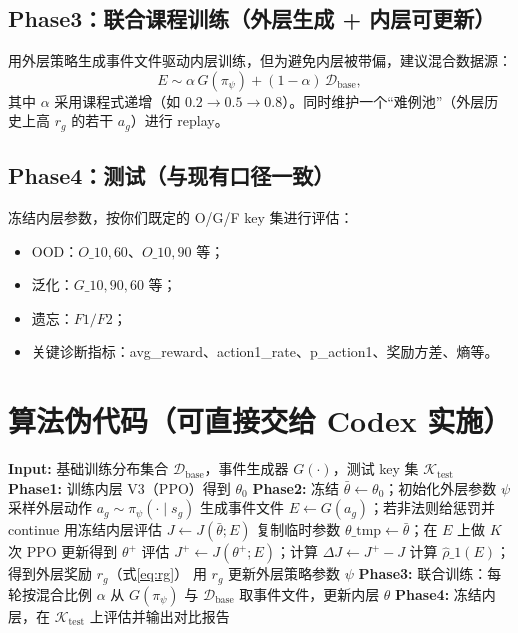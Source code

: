 \documentclass[UTF8,11pt,a4paper]{ctexart}
\begin{document}
\subsection{Phase3：联合课程训练（外层生成 + 内层可更新）}
用外层策略生成事件文件驱动内层训练，但为避免内层被带偏，建议混合数据源：
\begin{equation}
 E \sim \alpha\,G(\pi_\psi) + (1-\alpha)\,\mathcal{D}_{\mathrm{base}},
\end{equation}
其中 $\alpha$ 采用课程式递增（如 $0.2\to 0.5\to 0.8$）。同时维护一个``难例池''（外层历史上高 $r_g$ 的若干 $a_g$）进行 replay。

\subsection{Phase4：测试（与现有口径一致）}
冻结内层参数，按你们既定的 O/G/F key 集进行评估：
\begin{itemize}
\item OOD：$O\_{10,60}$、$O\_{10,90}$ 等；
\item 泛化：$G\_{10,90,60}$ 等；
\item 遗忘：$F1/F2$；
\item 关键诊断指标：avg\_reward、action1\_rate、p\_action1、奖励方差、熵等。
\end{itemize}

\section{算法伪代码（可直接交给 Codex 实施）}

\begin{algorithm}[H]
\caption{V3+EDRL（概念版伪代码）}
\begin{algorithmic}[1]
\State \textbf{Input:} 基础训练分布集合 $\mathcal{D}_{\mathrm{base}}$，事件生成器 $G(\cdot)$，测试 key 集 $\mathcal{K}_{\mathrm{test}}$
\State \textbf{Phase1:} 训练内层 V3（PPO）得到 $\theta_0$
\State \textbf{Phase2:} 冻结 $\bar\theta\leftarrow\theta_0$；初始化外层参数 $\psi$
  \State 采样外层动作 $a_g\sim\pi_\psi(\cdot\mid s_g)$
  \State 生成事件文件 $E\leftarrow G(a_g)$；若非法则给惩罚并 continue
  \State 用冻结内层评估 $J\leftarrow J(\bar\theta;E)$
  \State 复制临时参数 $\theta\_\mathrm{tmp}\leftarrow\bar\theta$；在 $E$ 上做 $K$ 次 PPO 更新得到 $\theta^+$
  \State 评估 $J^+\leftarrow J(\theta^+;E)$；计算 $\Delta J\leftarrow J^+-J$
  \State 计算 $\hat\rho\_1(E)$；得到外层奖励 $r_g$（式\eqref{eq:rg}）
  \State 用 $r_g$ 更新外层策略参数 $\psi$
\EndFor
\State \textbf{Phase3:} 联合训练：每轮按混合比例 $\alpha$ 从 $G(\pi_\psi)$ 与 $\mathcal{D}_{\mathrm{base}}$ 取事件文件，更新内层 $\theta$
\State \textbf{Phase4:} 冻结内层，在 $\mathcal{K}_{\mathrm{test}}$ 上评估并输出对比报告
\end{algorithmic}
\end{algorithm}
\end{document}
